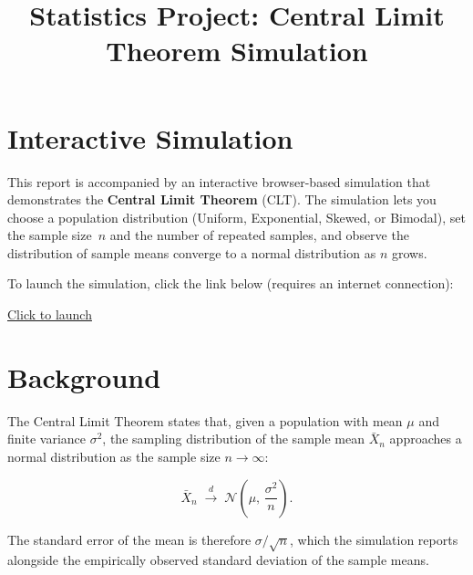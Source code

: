 \documentclass[12pt]{article}
\title{Statistics Project: Central Limit Theorem Simulation}
\author{}
\date{}
\begin{document}
\maketitle

\section*{Interactive Simulation}

This report is accompanied by an interactive browser-based simulation that
demonstrates the \textbf{Central Limit Theorem} (CLT).  The simulation lets
you choose a population distribution (Uniform, Exponential, Skewed, or
Bimodal), set the sample size~$n$ and the number of repeated samples, and
observe the distribution of sample means converge to a normal distribution
as $n$ grows.

\medskip
\noindent
To launch the simulation, click the link below (requires an internet
connection):

\medskip
\noindent
\href{https://subzeroxx5.github.io/Project-for-Statistics/simulation.html}{Click to launch}

\section*{Background}

The Central Limit Theorem states that, given a population with mean
$\mu$ and finite variance $\sigma^{2}$, the sampling distribution of
the sample mean $\bar{X}_{n}$ approaches a normal distribution as the
sample size $n \to \infty$:

\[
  \bar{X}_{n} \;\xrightarrow{d}\; \mathcal{N}\!\left(\mu,\,\frac{\sigma^{2}}{n}\right).
\]

The standard error of the mean is therefore $\sigma / \sqrt{n}$, which
the simulation reports alongside the empirically observed standard
deviation of the sample means.
\end{document}
